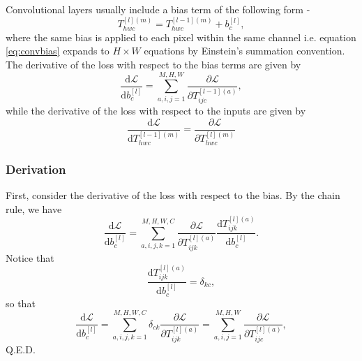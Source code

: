 \documentclass[modern]{aastex61}
\newcommand{\uderivative}{\mathrm{d}}
\begin{document}
Convolutional layers usually include a bias term of the following form -
\begin{equation} \label{eq:convbias}
  T^{[l](m)}_{hwc} = T^{[l-1](m)}_{hwc} + b^{[l]}_{c},
\end{equation}
where the same bias is applied to each pixel within the same channel i.e. equation \eqref{eq:convbias} expands to $H \times W$ equations by Einstein's summation convention. The derivative of the loss with respect to the  bias terms are given by
\begin{equation} \label{eq:gradconvbias}
  \frac{\uderivative \mathscr{L}}{\uderivative b^{[l]}_{c}} = \sum_{a, i, j = 1}^{M, H, W} \frac{\partial \mathscr{L}}{\partial T^{[l-1](a)}_{ijc}},
\end{equation}
while the derivative of the loss with respect to the inputs are given by
\begin{equation} \label{eq:propconvbias}
  \frac{\uderivative \mathscr{L}}{\uderivative T^{[l-1](m)}_{hwc}} = \frac{\partial \mathscr{L}}{\partial  T^{[l](m)}_{hwc}}
\end{equation}

\subsubsection{Derivation}
First, consider the derivative of the loss with respect to the bias. By the chain rule, we have
\begin{equation*}
  \frac{\uderivative \mathscr{L}}{\uderivative b^{[l]}_{c}} = \sum_{a, i, j, k = 1}^{M, H, W, C} \frac{\partial \mathscr{L}}{\partial T^{[l](a)}_{ijk}} \frac{\uderivative T^{[l](a)}_{ijk}}{\uderivative b^{[l]}_{c}}.
\end{equation*}
Notice that
\begin{equation*}
  \frac{\uderivative T^{[l](a)}_{ijk}}{\uderivative b^{[l]}_{c}} = \delta_{kc},
\end{equation*} so that
\begin{equation*}
  \frac{\uderivative \mathscr{L}}{\uderivative b^{[l]}_{c}} = \sum_{a, i, j, k = 1}^{M, H, W, C} \delta_{ck} \frac{\partial \mathscr{L}}{\partial T^{[l](a)}_{ijk}} = \sum_{a, i, j = 1}^{M, H, W} \frac{\partial \mathscr{L}}{\partial T^{[l](a)}_{ijc}},
\end{equation*}
Q.E.D.
\end{document}
